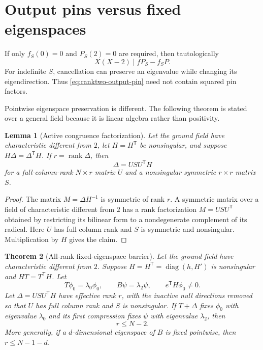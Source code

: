 \documentclass[11pt,reqno]{amsart}
\newtheorem{theorem}{Theorem}[section]
\newtheorem{lemma}[theorem]{Lemma}
\theoremstyle{definition}
\theoremstyle{remark}
\DeclareMathOperator{\rank}{rank}
\begin{document}
\section{Output pins versus fixed eigenspaces}

If only $f_S(0)=0$ and $P_S(2)=0$ are required, then tautologically
\begin{equation}\label{eq:ranktwo-output-pin}
 X(X-2)\mid fP_S-f_SP.
\end{equation}
For indefinite $S$, cancellation can preserve an eigenvalue while changing
its eigendirection.  Thus \eqref{eq:ranktwo-output-pin} need not contain
squared pin factors.

Pointwise eigenspace preservation is different.  The following theorem is
stated over a general field because it is linear algebra rather than
positivity.

\begin{lemma}[Active congruence factorization]\label{lem:activefactor}
Let the ground field have characteristic different from $2$, let
$H=H^{\mathsf T}$ be nonsingular, and suppose
$H\Delta=\Delta^{\mathsf T}H$.  If $r=\rank\Delta$, then
\[
 \Delta=USU^{\mathsf T}H
\]
for a full-column-rank $N\times r$ matrix $U$ and a nonsingular symmetric
$r\times r$ matrix $S$.
\end{lemma}

\begin{proof}
The matrix $M=\Delta H^{-1}$ is symmetric of rank $r$.  A symmetric matrix
over a field of characteristic different from $2$ has a rank factorization
$M=USU^{\mathsf T}$ obtained by restricting its bilinear form to a
nondegenerate complement of its radical.  Here $U$ has full column rank and
$S$ is symmetric and nonsingular.  Multiplication by $H$ gives the claim.
\end{proof}

\begin{theorem}[All-rank fixed-eigenspace barrier]\label{thm:allrankbarrier}
Let the ground field have characteristic different from $2$.  Suppose
$H=H^{\mathsf T}=\operatorname{diag}(h,H')$ is nonsingular and
$HT=T^{\mathsf T}H$.
Let
\[
 T\phi_0=\lambda_0\phi_0,\qquad B\psi=\lambda_2\psi,\qquad
 e^{\mathsf T}H\phi_0\ne0.
\]
Let $\Delta=USU^{\mathsf T}H$ have effective rank $r$, with the inactive
null directions removed so that $U$ has full column rank and $S$ is
nonsingular.  If $T+\Delta$ fixes $\phi_0$ with eigenvalue $\lambda_0$ and
its first compression fixes $\psi$ with eigenvalue $\lambda_2$, then
\begin{equation}\label{eq:rankbarrier}
 r\leq N-2.
\end{equation}
More generally, if a $d$-dimensional eigenspace of $B$ is fixed pointwise,
then $r\leq N-1-d$.
\end{theorem}
\end{document}
